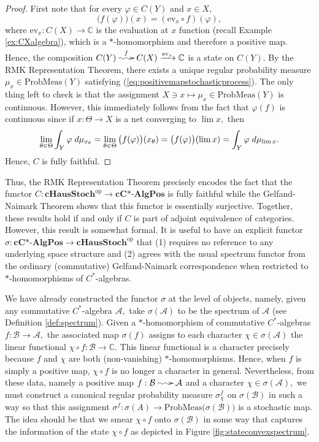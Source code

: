 \documentclass[12pt]{article}
\makeatletter
\edef\t{\pgfmathresult}%
\theoremstyle{theorem}
\theoremstyle{definition}
\numberwithin{equation}{section}
\let\s=\sigma \let\t=\tau \let\u=\upsilon \let\f=\phi \let\c=\chi
\let\C=\Chi \let\W=\Omega
\def\vf{\varphi}
\newcommand{\be}{\begin{equation}}
\newcommand{\ee}{\end{equation}}
\newcommand{\bprf}{\begin{proof}}
\newcommand{\eprf}{\end{proof}}
\newcommand{\<}{\langle}
\renewcommand{\>}{\rangle}
\def\ev{{{\mathrm{ev}}}}
\def\C{{{\mathbb C}}}
\newcommand{\cCAlgPos}{\mathbf{cC\text{*-}AlgPos}}
\def\mA{{{\mathcal{A}}}}
\def\mB{{{\mathcal{B}}}}
\newcommand{\op}{\mathrm{op}}
\newcommand{\cHStoch}{\mathbf{cHausStoch}}
\newcommand{\stoch}{\;\xy0;/r.25pc/:\ar@{~>}(3,0);(-3,0);\endxy\;}
\makeatother
\begin{document}
\bprf
First note that for every $\vf\in C(Y)$ and $x\in X,$ 
\be
\big(f(\vf)\big)(x)=(\ev_{x}\circ f)(\vf),
\ee
where $\ev_{x}:C(X)\to\C$ is the evaluation at $x$ function
(recall Example \ref{ex:CXalgebra}),
which is a {$*$-homomorphism} and therefore a positive map.
Hence, the composition
$C(Y)\;\xy0;/r.25pc/:\ar@{~>}(-3,0);(3,0)^{f}\endxy\;C(X)\xrightarrow{\ev_{x}}\C$
is a state on $C(Y).$ 
By the RMK Representation Theorem, %
there exists a unique regular probability measure
$\mu_{x}\in\mathrm{ProbMeas}(Y)$ satisfying 
(\ref{eq:positivemapstochasticprocess}). 
The only thing left to check is that the assignment
$X\ni x\mapsto\mu_{x}\in\mathrm{ProbMeas}(Y)$
is continuous. However, this immediately follows from the
fact that $\vf(f)$ is continuous since if 
$x:\Theta\to X$ is a net converging to $\lim x,$ 
then 
\be
\lim_{\q\in\Theta}\int_{Y}\vf\;d\mu_{x_\q}=\lim_{\q\in\Theta}\big(f(\vf)\big)(x_\q)
=\big(f(\vf)\big)(\lim x)
=\int_{Y}\vf\;d\mu_{\lim x}.
\ee
Hence, $C$ is fully faithful. 
\eprf

Thus, the RMK Representation Theorem precisely encodes the fact that 
the functor $C:\cHStoch^{\op}\to\cCAlgPos$ is fully faithful while  
the Gelfand-Naimark Theorem shows that this functor is essentially
surjective. Together, these results hold if and only if $C$ is part of
adjoint equivalence of categories. 
However, this result is somewhat formal. It is useful to have 
an explicit functor $\s:\cCAlgPos\to\cHStoch^{\op}$ that (1) requires no
reference to any underlying space structure and (2) agrees
with the usual spectrum functor from the ordinary (commutative) Gelfand-Naimark
correspondence when restricted to {$*$-homomorphisms} of $C^*$-algebras.

We have already constructed the functor $\s$ at the level of objects, 
namely, given any commutative $C^*$-algebra $\mathcal{A},$
take $\s(\mA)$ to be the spectrum of $\mA$ (see Definition \ref{def:spectrum}). 
Given a {$*$-homomorphism} of commutative $C^*$-algebras 
$f:\mB\to\mA,$ the associated map $\s(f)$ assigns to each
character $\chi\in\s(\mA)$ the linear functional $\chi\circ f:\mB\to\C.$
This linear functional is a character precisely because $f$ and $\chi$ are both
(non-vanishing) {$*$-homomorphisms.} Hence, when $f$ is simply a positive map, 
$\chi\circ f$ is no longer a character in general. Nevertheless, from these data, 
namely a positive map $f:\mB\stoch\mA$ and a character $\chi\in\s(\mA),$
we must construct a canonical regular probability measure $\s^{f}_{\chi}$
on $\s(\mB)$ in such a way so that this assignment 
$\s^{f}:\s(A)\to\mathrm{ProbMeas}\big(\s(\mB)\big)$ is a 
stochastic map. The idea should be that we smear $\chi\circ f$ onto $\s(\mB)$ 
in some way that captures the information of the state $\chi\circ f$
as depicted in Figure \ref{fig:stateconvexspectrum}. 
\end{document}
